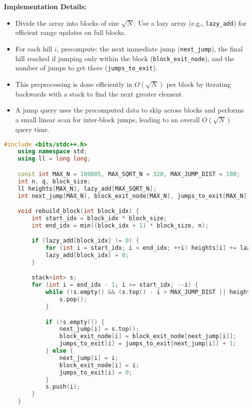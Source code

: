 \documentclass[12pt]{article}
\begin{document}
\begin{itemize}
{    \textbf{Implementation Details:}
    \begin{itemize}
        \item Divide the array into blocks of size $\sqrt{N}$. Use a lazy array (e.g., \texttt{lazy\_add}) for efficient range updates on full blocks.
        \item For each hill $i$, precompute: the next immediate jump (\texttt{next\_jump}), the final hill reached if jumping only within the block (\texttt{block\_exit\_node}), and the number of jumps to get there (\texttt{jumps\_to\_exit}).
        \item This preprocessing is done efficiently in $O(\sqrt{N})$ per block by iterating backwards with a stack to find the next greater element.
        \item A jump query uses the precomputed data to skip across blocks and performs a small linear scan for inter-block jumps, leading to an overall $O(\sqrt{N})$ query time.
    \end{itemize}
    \begin{lstlisting}[language=C++, basicstyle=\ttfamily\fontsize{7pt}{8pt}\selectfont]
    #include <bits/stdc++.h>
    using namespace std;
    using ll = long long;

    const int MAX_N = 100005, MAX_SQRT_N = 320, MAX_JUMP_DIST = 100;
    int n, q, block_size;
    ll heights[MAX_N], lazy_add[MAX_SQRT_N];
    int next_jump[MAX_N], block_exit_node[MAX_N], jumps_to_exit[MAX_N];

    void rebuild_block(int block_idx) {
        int start_idx = block_idx * block_size;
        int end_idx = min((block_idx + 1) * block_size, n);

        if (lazy_add[block_idx] != 0) {
            for (int i = start_idx; i < end_idx; ++i) heights[i] += lazy_add[block_idx];
            lazy_add[block_idx] = 0;
        }

        stack<int> s;
        for (int i = end_idx - 1; i >= start_idx; --i) {
            while (!s.empty() && (s.top() - i > MAX_JUMP_DIST || heights[s.top()] <= heights[i])) {
                s.pop();
            }

            if (!s.empty()) {
                next_jump[i] = s.top();
                block_exit_node[i] = block_exit_node[next_jump[i]];
                jumps_to_exit[i] = jumps_to_exit[next_jump[i]] + 1;
            } else {
                next_jump[i] = i;
                block_exit_node[i] = i;
                jumps_to_exit[i] = 0;
            }
            s.push(i);
        }
    }


\end{lstlisting}}
\end{itemize}
\end{document}
